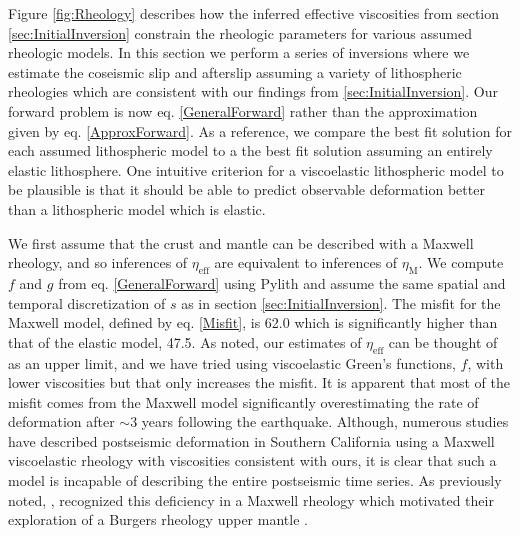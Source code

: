 \documentclass[1p]{elsarticle}
\begin{document}
Figure \ref{fig:Rheology} describes how the inferred effective viscosities from section \ref{sec:InitialInversion} constrain the rheologic parameters for various assumed rheologic models. In this section we perform a series of inversions where we estimate the coseismic slip and afterslip assuming a variety of lithospheric rheologies which are consistent with our findings from \ref{sec:InitialInversion}.  Our forward problem is now eq. \ref{GeneralForward} rather than the approximation given by eq. \ref{ApproxForward}.  As a reference, we compare the best fit solution for each assumed lithospheric model to a the best fit solution assuming an entirely elastic lithosphere. One intuitive criterion for a viscoelastic lithospheric model to be plausible is that it should be able to predict observable deformation better than a lithospheric model which is elastic.   

We first assume that the crust and mantle can be described with a Maxwell rheology, and so inferences of $\eta_{\mathrm{eff}}$ are equivalent to inferences of $\eta_{\mathrm{M}}$. We compute $f$ and $g$ from eq. \ref{GeneralForward} using Pylith \citep{Aagaard2009} and assume the same spatial and temporal discretization of $s$ as in section \ref{sec:InitialInversion}. The misfit for the Maxwell model, defined by eq. \ref{Misfit}, is 62.0 which is significantly higher than that of the elastic model, 47.5. As noted, our estimates of $\eta_\mathrm{eff}$ can be thought of as an upper limit, and we have tried using viscoelastic Green's functions, $f$, with lower viscosities but that only increases the misfit. It is apparent that most of the misfit comes from the Maxwell model significantly overestimating the rate of deformation after $\sim 3$ years following the earthquake.  Although, numerous studies have described postseismic deformation in Southern California using a Maxwell viscoelastic rheology with viscosities consistent with ours, it is clear that such a model is incapable of describing the entire postseismic time series. As previously noted, \cite{Pollitz2001}, recognized this deficiency in a Maxwell rheology which motivated their exploration of a Burgers rheology upper mantle \citep{Pollitz2003}.  
\end{document}
